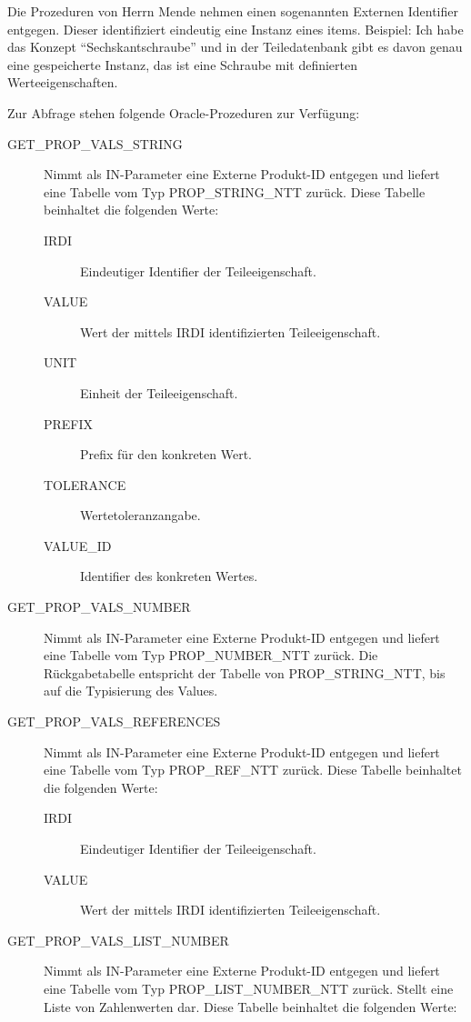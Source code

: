Die Prozeduren von Herrn Mende nehmen einen sogenannten Externen Identifier entgegen. Dieser identifiziert eindeutig eine Instanz eines \glspl{item}. 
Beispiel: Ich habe das Konzept \enquote{Sechskantschraube} und in der Teiledatenbank gibt es davon genau eine gespeicherte Instanz, das ist eine Schraube mit definierten Werteeigenschaften. 

Zur Abfrage stehen folgende Oracle-Prozeduren zur Verfügung:

\begin{description}
\item[GET\_PROP\_VALS\_STRING] Nimmt als IN-Parameter eine Externe Produkt-ID entgegen und liefert eine Tabelle vom Typ PROP\_STRING\_NTT zurück. 
Diese Tabelle beinhaltet die folgenden Werte: 
  \begin{description}
  \item[IRDI] Eindeutiger Identifier der Teileeigenschaft.
  \item[VALUE] Wert der mittels IRDI identifizierten Teileeigenschaft.
  \item[UNIT] Einheit der Teileeigenschaft.
  \item[PREFIX] Prefix für den konkreten Wert.
  \item[TOLERANCE] Wertetoleranzangabe.
  \item[VALUE\_ID] Identifier des konkreten Wertes.
  \end{description}

\item[GET\_PROP\_VALS\_NUMBER]  Nimmt als IN-Parameter eine Externe Produkt-ID entgegen und liefert eine Tabelle vom Typ PROP\_NUMBER\_NTT zurück. 
Die Rückgabetabelle entspricht der Tabelle von PROP\_STRING\_NTT, bis auf die Typisierung des Values. 
\item[GET\_PROP\_VALS\_REFERENCES]  Nimmt als IN-Parameter eine Externe Produkt-ID entgegen und liefert eine Tabelle vom Typ PROP\_REF\_NTT zurück. 
Diese Tabelle beinhaltet die folgenden Werte: 
  \begin{description}
  \item[IRDI] Eindeutiger Identifier der Teileeigenschaft.
  \item[VALUE] Wert der mittels IRDI identifizierten Teileeigenschaft.
  \end{description}
\item[GET\_PROP\_VALS\_LIST\_NUMBER] Nimmt als IN-Parameter eine Externe Produkt-ID entgegen und liefert eine Tabelle vom Typ PROP\_LIST\_NUMBER\_NTT zurück. Stellt eine Liste von Zahlenwerten dar. 
Diese Tabelle beinhaltet die folgenden Werte: 


\end{description}
